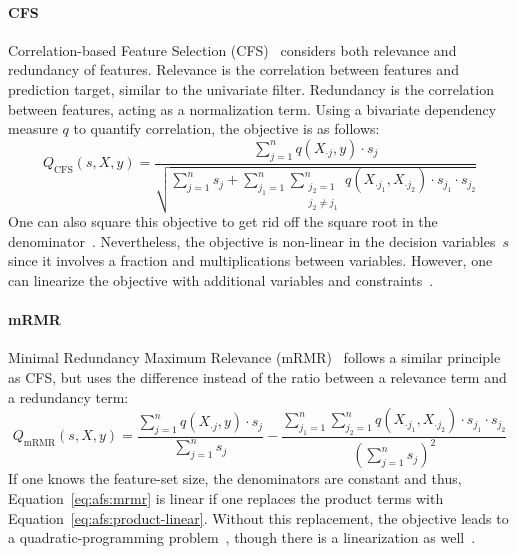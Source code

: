 \documentclass{article}
\theoremstyle{definition}
\begin{document}
\paragraph{CFS}

Correlation-based Feature Selection (CFS)~\cite{hall1999correlation, hall2000correlation} considers both relevance and redundancy of features.
Relevance is the correlation between features and prediction target, similar to the univariate filter.
Redundancy is the correlation between features, acting as a normalization term.
Using a bivariate dependency measure $q$ to quantify correlation, the objective is as follows:
%
\begin{equation}
	Q_{\text{CFS}}(s,X,y) = \frac{\sum_{j=1}^{n} q(X_{\cdot{}j},y) \cdot s_j}{\sqrt{\sum_{j=1}^{n} s_j + \sum_{j_1=1}^{n} \sum_{\substack{j_2=1 \\ j_2 \neq j_1}}^{n} q(X_{\cdot{}j_1}, X_{\cdot{}j_2}) \cdot s_{j_1} \cdot s_{j_2}}}
	\label{eq:afs:cfs}
\end{equation}
%
One can also square this objective to get rid off the square root in the denominator~\cite{nguyen2010towards}.
Nevertheless, the objective is non-linear in the decision variables~$s$ since it involves a fraction and multiplications between variables.
However, one can linearize the objective with additional variables and constraints~\cite{nguyen2010improving, nguyen2010towards}.

\paragraph{mRMR}

Minimal Redundancy Maximum Relevance (mRMR)~\cite{peng2005feature} follows a similar principle as CFS, but uses the difference instead of the ratio between a relevance term and a redundancy term:
%
\begin{equation}
	Q_{\text{mRMR}}(s,X,y) = \frac{\sum_{j=1}^{n} q(X_{\cdot{}j},y) \cdot s_j}{\sum_{j=1}^{n} s_j} - \frac{\sum_{j_1=1}^{n} \sum_{j_2=1}^{n} q(X_{\cdot{}j_1}, X_{\cdot{}j_2}) \cdot s_{j_1} \cdot s_{j_2}}{(\sum_{j=1}^{n} s_j)^2}
	\label{eq:afs:mrmr}
\end{equation}
%
If one knows the feature-set size, the denominators are constant and thus, Equation~\ref{eq:afs:mrmr} is linear if one replaces the product terms with Equation~\ref{eq:afs:product-linear}.
Without this replacement, the objective leads to a quadratic-programming problem~\cite{nguyen2014effective, rodriguez2010quadratic}, though there is a linearization as well~\cite{nguyen2009optimizing, nguyen2010towards}.
\end{document}

